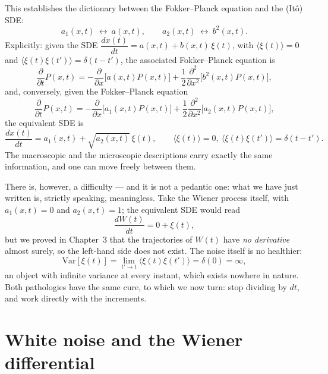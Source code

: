 This establishes the dictionary between the Fokker--Planck equation and the (It\^o) SDE:
\begin{equation}
a_1(x,t)\ \longleftrightarrow\ a(x,t),\qquad a_2(x,t)\ \longleftrightarrow\ b^2(x,t).
\end{equation}
Explicitly: given the SDE $\dfrac{dx(t)}{dt} = a(x,t) + b(x,t)\,\xi(t)$, with $\langle\xi(t)\rangle=0$ and $\langle\xi(t)\xi(t')\rangle=\delta(t-t')$, the associated Fokker--Planck equation is
\begin{equation}
\frac{\partial}{\partial t}P(x,t) = -\frac{\partial}{\partial x}\big[a(x,t)P(x,t)\big] + \frac{1}{2}\frac{\partial^2}{\partial x^2}\big[b^2(x,t)P(x,t)\big],
\end{equation}
and, conversely, given the Fokker--Planck equation
\begin{equation}
\frac{\partial}{\partial t}P(x,t) = -\frac{\partial}{\partial x}\big[a_1(x,t)P(x,t)\big] + \frac{1}{2}\frac{\partial^2}{\partial x^2}\big[a_2(x,t)P(x,t)\big],
\end{equation}
the equivalent SDE is
\begin{equation}
\frac{dx(t)}{dt} = a_1(x,t) + \sqrt{a_2(x,t)}\,\xi(t),\qquad \langle\xi(t)\rangle=0,\ \langle\xi(t)\xi(t')\rangle=\delta(t-t').
\end{equation}
The macroscopic and the microscopic descriptions carry exactly the same information, and one can move freely between them.

There is, however, a difficulty --- and it is not a pedantic one: what we have just written is, strictly speaking, meaningless.
Take the Wiener process itself, with $a_1(x,t)=0$ and $a_2(x,t)=1$; the equivalent SDE would read
\begin{equation}
\frac{dW(t)}{dt} = 0 + \xi(t),
\end{equation}
but we proved in Chapter~3 that the trajectories of $W(t)$ have \emph{no derivative} almost surely, so the left-hand side does not exist.
The noise itself is no healthier:
\begin{equation}
\mathrm{Var}[\xi(t)] = \lim_{t'\to t}\langle\xi(t)\xi(t')\rangle = \delta(0) = \infty,
\end{equation}
an object with infinite variance at every instant, which exists nowhere in nature.
Both pathologies have the same cure, to which we now turn: stop dividing by $dt$, and work directly with the increments.


\section{White noise and the Wiener differential}

